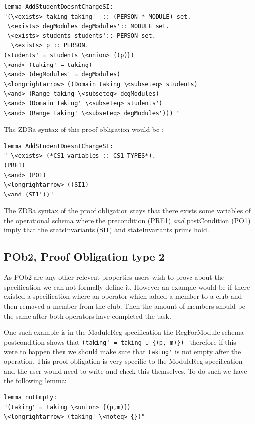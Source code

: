 \begin{verbatim}
lemma AddStudentDoesntChangeSI:
"(\<exists> taking taking'  :: (PERSON * MODULE) set.
 \<exists> degModules degModules':: MODULE set.
 \<exists> students students':: PERSON set.
  \<exists> p :: PERSON.
(students' = students \<union> {(p)}) 
\<and> (taking' = taking)
\<and> (degModules' = degModules)
\<longrightarrow> ((Domain taking \<subseteq> students)
\<and> (Range taking \<subseteq> degModules)
\<and> (Domain taking' \<subseteq> students')
\<and> (Range taking' \<subseteq> degModules'))) "
\end{verbatim}

The ZDRa syntax of this proof obligation would be :

\begin{verbatim}
lemma AddStudentDoesntChangeSI:
" \<exists> (*CS1_variables :: CS1_TYPES*).
(PRE1)
\<and> (PO1)
\<longrightarrow> ((SI1)
\<and (SI1'))"
\end{verbatim}

 The ZDRa syntax of the proof obligation stays that there exists some variables of the operational schema where the precondition (PRE1) \emph{and} postCondition (PO1) imply that the stateInvariants (SI1) and stateInvariants prime hold.

\subsection{POb2, Proof Obligation type 2}

As POb2 are any other relevent properties users wish to prove about the specification we can not formally define it. However an example would be if there existed a specification where an operator which added a member to a club and then removed a member from the club. Then the amount of members should be the same after both operators have completed the task.

One such example is in the ModuleReg specification the RegForModule schema postcondition shows that \verb|(taking' = taking ∪ {(p, m)}) | therefore if this were to happen then we should make sure that \verb|taking'| is not empty after the operation. This proof obligation is very specific to the ModuleReg specification and the user would need to write and check this themselves. To do such we have the following lemma:

\begin{verbatim}
lemma notEmpty:
"(taking' = taking \<union> {(p,m)}) 
\<longrightarrow> (taking' \<noteq> {})"
\end{verbatim}

